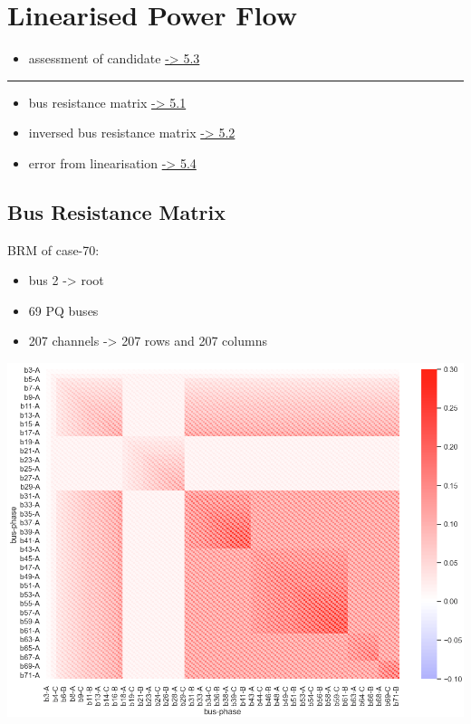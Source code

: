 \documentclass[
]{book}
\providecommand{\tightlist}{%
  \setlength{\itemsep}{0pt}\setlength{\parskip}{0pt}}
\begin{document}
\hypertarget{linearised-power-flow}{%
\chapter{Linearised Power Flow}\label{linearised-power-flow}}

\begin{itemize}
\tightlist
\item
  assessment of candidate \protect\hyperlink{assessment}{-\textgreater{} 5.3}
\end{itemize}

\begin{center}\rule{0.5\linewidth}{0.5pt}\end{center}

\begin{itemize}
\tightlist
\item
  bus resistance matrix \protect\hyperlink{BRM}{-\textgreater{} 5.1}
\item
  inversed bus resistance matrix \protect\hyperlink{brmInv}{-\textgreater{} 5.2}
\item
  error from linearisation \protect\hyperlink{error}{-\textgreater{} 5.4}
\end{itemize}

\hypertarget{BRM}{%
\section{Bus Resistance Matrix}\label{BRM}}

BRM of case-70:

\begin{itemize}
\tightlist
\item
  bus 2 -\textgreater{} root
\item
  69 PQ buses
\item
  207 channels -\textgreater{} 207 rows and 207 columns
\end{itemize}

\begin{center}\includegraphics{Pictures/figHeatmapBRM} \end{center}
\end{document}
